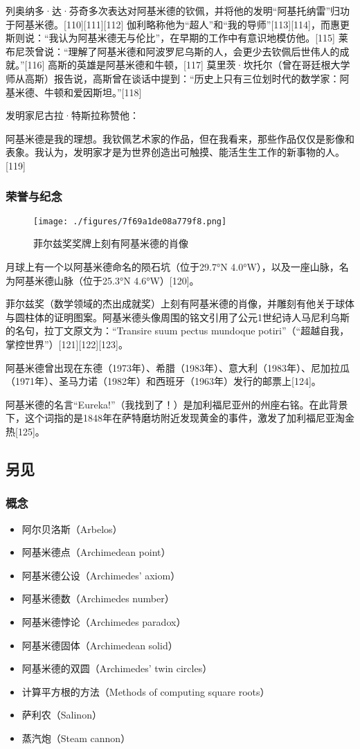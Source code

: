 列奥纳多·达·芬奇多次表达对阿基米德的钦佩，并将他的发明“阿基托纳雷”归功于阿基米德。[110][111][112] 伽利略称他为“超人”和“我的导师”[113][114]，而惠更斯则说：“我认为阿基米德无与伦比”，在早期的工作中有意识地模仿他。[115] 莱布尼茨曾说：“理解了阿基米德和阿波罗尼乌斯的人，会更少去钦佩后世伟人的成就。”[116] 高斯的英雄是阿基米德和牛顿，[117] 莫里茨·坎托尔（曾在哥廷根大学师从高斯）报告说，高斯曾在谈话中提到：“历史上只有三位划时代的数学家：阿基米德、牛顿和爱因斯坦。”[118]

发明家尼古拉·特斯拉称赞他：

阿基米德是我的理想。我钦佩艺术家的作品，但在我看来，那些作品仅仅是影像和表象。我认为，发明家才是为世界创造出可触摸、能活生生工作的新事物的人。[119]
\subsubsection{荣誉与纪念}
\begin{figure}[ht]
\centering
\texttt{[image: ./figures/7f69a1de08a779f8.png]}
\caption{菲尔兹奖奖牌上刻有阿基米德的肖像} \label{fig_Archim_12}
\end{figure}
月球上有一个以阿基米德命名的陨石坑（位于29.7°N 4.0°W），以及一座山脉，名为阿基米德山脉（位于25.3°N 4.6°W）[120]。

菲尔兹奖（数学领域的杰出成就奖）上刻有阿基米德的肖像，并雕刻有他关于球体与圆柱体的证明图案。阿基米德头像周围的铭文引用了公元1世纪诗人马尼利乌斯的名句，拉丁文原文为：“Transire suum pectus mundoque potiri”（“超越自我，掌控世界”）[121][122][123]。

阿基米德曾出现在东德（1973年）、希腊（1983年）、意大利（1983年）、尼加拉瓜（1971年）、圣马力诺（1982年）和西班牙（1963年）发行的邮票上[124]。

阿基米德的名言“Eureka!”（我找到了！）是加利福尼亚州的州座右铭。在此背景下，这个词指的是1848年在萨特磨坊附近发现黄金的事件，激发了加利福尼亚淘金热[125]。
\subsection{另见}
\subsubsection{概念}  
\begin{itemize}
\item 阿尔贝洛斯（Arbelos）  
\item 阿基米德点（Archimedean point）  
\item 阿基米德公设（Archimedes' axiom）  
\item 阿基米德数（Archimedes number）  
\item 阿基米德悖论（Archimedes paradox）  
\item 阿基米德固体（Archimedean solid）  
\item 阿基米德的双圆（Archimedes' twin circles）  
\item 计算平方根的方法（Methods of computing square roots）  
\item 萨利农（Salinon）  
\item 蒸汽炮（Steam cannon） 
\end{itemize} 
